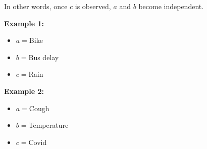In other words, once $c$ is observed, $a$ and $b$ become independent.
\newline

\textbf{Example 1:}
\begin{itemize}
	\item $a=$Bike

	\item $b=$Bus delay

	\item $c=$Rain
\end{itemize}

\textbf{Example 2:}
\begin{itemize}
	\item $a=$Cough

	\item $b=$Temperature

	\item $c=$Covid
\end{itemize}

